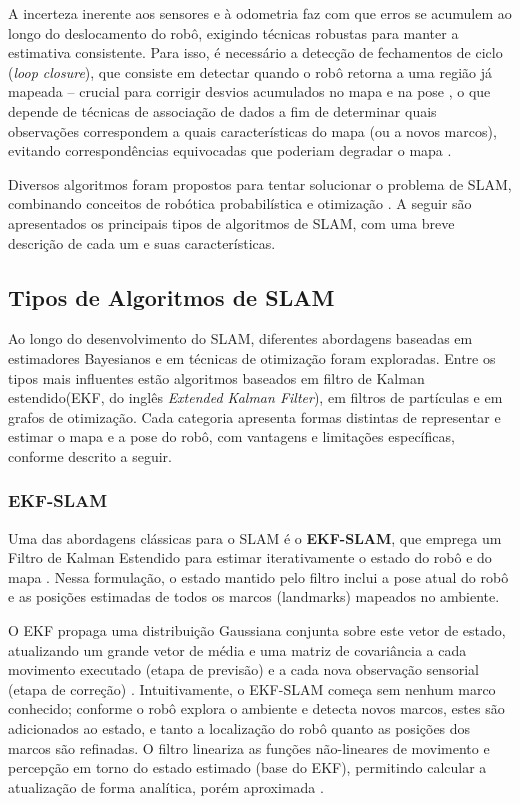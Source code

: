 A incerteza inerente aos sensores e à odometria faz com que erros se acumulem ao longo do deslocamento do robô, exigindo técnicas robustas para manter a estimativa consistente. Para isso, é necessário a detecção de fechamentos de ciclo (\textit{loop closure}), que consiste em detectar quando o robô retorna a uma região já mapeada – crucial para corrigir desvios acumulados no mapa e na pose \cite{Labbe2014}, o que depende de técnicas de associação de dados a fim de determinar quais observações correspondem a quais características do mapa (ou a novos marcos), evitando correspondências equivocadas que poderiam degradar o mapa \cite{Cadena2016}.

Diversos algoritmos foram propostos para tentar solucionar o problema de SLAM, combinando conceitos de robótica probabilística e otimização \cite{Thrun2005}\cite{Cadena2016}. A seguir são apresentados os principais tipos de algoritmos de SLAM, com uma breve descrição de cada um e suas características.

    \subsection{Tipos de Algoritmos de SLAM}
    
    Ao longo do desenvolvimento do SLAM, diferentes abordagens baseadas em estimadores Bayesianos e em técnicas de otimização foram exploradas. Entre os tipos mais influentes estão algoritmos baseados em filtro de Kalman estendido(EKF, do inglês \textit{Extended Kalman Filter}), em filtros de partículas e em grafos de otimização. Cada categoria apresenta formas distintas de representar e estimar o mapa e a pose do robô, com vantagens e limitações específicas, conforme descrito a seguir.
    
        \subsubsection{EKF-SLAM}
        
        Uma das abordagens clássicas para o SLAM é o \textbf{EKF-SLAM}, que emprega um Filtro de Kalman Estendido para estimar iterativamente o estado do robô e do mapa \cite{Thrun2005}. Nessa formulação, o estado mantido pelo filtro inclui a pose atual do robô e as posições estimadas de todos os marcos (landmarks) mapeados no ambiente. 
        
        O EKF propaga uma distribuição Gaussiana conjunta sobre este vetor de estado, atualizando um grande vetor de média e uma matriz de covariância a cada movimento executado (etapa de previsão) e a cada nova observação sensorial (etapa de correção) \cite{Thrun2005}. Intuitivamente, o EKF-SLAM começa sem nenhum marco conhecido; conforme o robô explora o ambiente e detecta novos marcos, estes são adicionados ao estado, e tanto a localização do robô quanto as posições dos marcos são refinadas. O filtro lineariza as funções não-lineares de movimento e percepção em torno do estado estimado (base do EKF), permitindo calcular a atualização de forma analítica, porém aproximada \cite{Thrun2005}. 
        
